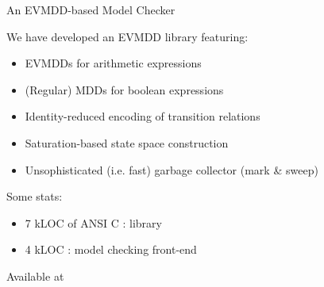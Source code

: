 \documentclass{beamer}
\begin{document}
\begin{frame}[containsverbatim]{An EVMDD-based Model Checker}

  We have developed an EVMDD library featuring:
  \begin{itemize}
  \item EVMDDs for arithmetic expressions
  \item (Regular) MDDs for boolean expressions
  \item Identity-reduced encoding of transition relations
  \item Saturation-based state space construction
  \item Unsophisticated (i.e. fast) garbage collector (mark \& sweep)
  \end{itemize}
  
  \vfill 

  Some stats:
  \begin{itemize}
  \item 7 kLOC of ANSI C : library
  \item 4 kLOC : model checking front-end
  \end{itemize}

  \vfill
  \begin{center}
    \begin{block}{}
      Available at \alert{\evmddurl}
    \end{block}
  \end{center}
\end{frame}
\end{document}
